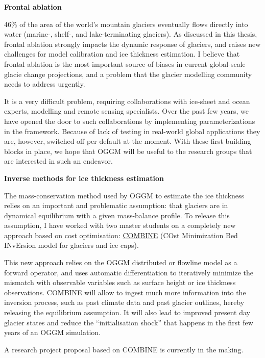 \textbf{Frontal ablation}

46\% of the area of the world’s mountain glaciers eventually flows directly into water (marine-, shelf-, and
lake-terminating glaciers). As discussed in this thesis, frontal ablation strongly impacts the dynamic response of
glaciers, and raises new challenges for model calibration and ice thickness estimation.
I believe that frontal ablation is the most important source of biases in current global-scale glacie change projections,
and a problem that the glacier modelling community needs to address urgently.

It is a very difficult problem, requiring collaborations with ice-sheet and ocean experts, modelling  and remote
sensing specialists. Over the past few years, we have opened the door to such collaborations by implementing parameterizations
in the framework. Because of lack of testing in real-world global applications they are, however, switched off
per default at the moment. With these first building blocks in place, we hope that OGGM will
be useful to the research groups that are interested in such an endeavor.

\textbf{Inverse methods for ice thickness estimation}

The mass-conservation method used by OGGM to estimate the ice thickness relies on an important and problematic
assumption: that glaciers are in dynamical equilibrium with a given mass-balance profile. To release this
assumption, I have worked with two master students on a completely new approach based on cost optimisation:
\href{https://github.com/OGGM/combine}{COMBINE} (COst Minimization Bed INvErsion model for glaciers and ice caps).

This new approach relies on the OGGM distributed or flowline model as a forward operator, and uses automatic
differentiation to iteratively minimize the mismatch with observable variables such as surface height or
ice thickness observations. COMBINE will allow to ingest much more information into the inversion process,
such as past climate data and past glacier outlines, hereby releasing the equilibrium assumption. It will
also lead to improved present day glacier states and reduce the “initialisation shock” that happens in the
first few years of an OGGM simulation.

A research project proposal based on COMBINE is currently in the making.


